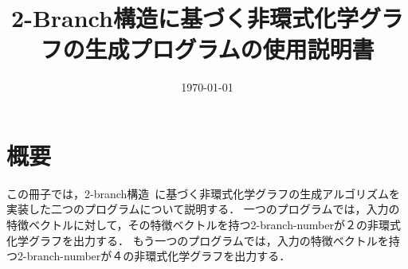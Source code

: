 \documentclass[11pt,titlepage,dvipdfmx,twoside]{jarticle}
\title{\Huge{2-Branch構造に基づく非環式化学グラフの生成プログラムの使用説明書}}
\begin{document}
\makeatletter 
\let\c@lstlisting\c@figure
\makeatother

\date{\today}

\maketitle


\thispagestyle{empty}
\tableofcontents
\clearpage


\section{概要}
この冊子では，2-branch構造~\cite{branch}に基づく非環式化学グラフの生成アルゴリズムを実装した二つのプログラムについて説明する．
一つのプログラムでは，入力の特徴ベクトルに対して，その特徴ベクトルを持つ2-branch-numberが２の非環式化学グラフを出力する．
もう一つのプログラムでは，入力の特徴ベクトルを持つ2-branch-numberが４の非環式化学グラフを出力する．
\end{document}
